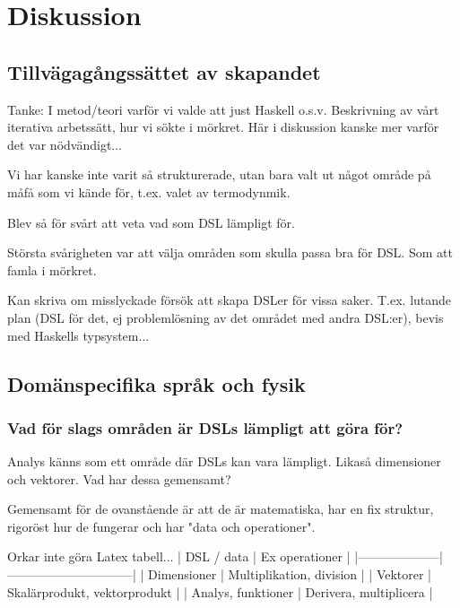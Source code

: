 
\chapter{Diskussion}

\begin{binge}
\section{Tillvägagångssättet av skapandet}

Tanke: I metod/teori varför vi valde att just Haskell o.s.v. Beskrivning av vårt iterativa arbetssätt, hur vi sökte i mörkret. Här i diskussion kanske mer varför det var nödvändigt...

Vi har kanske inte varit så strukturerade, utan bara valt ut något område på måfå som vi kände för, t.ex. valet av termodynmik.

Blev så för svårt att veta vad som DSL lämpligt för.

Största svårigheten var att välja områden som skulla passa bra för DSL. Som att
famla i mörkret.

Kan skriva om misslyckade försök att skapa DSLer för vissa saker. T.ex. lutande plan (DSL för det, ej problemlösning av det området med andra DSL:er), bevis med Haskells typsystem...

\section{Domänspecifika språk och fysik}

\subsection{Vad för slags områden är DSLs lämpligt att göra för?}

Analys känns som ett område där DSLs kan vara lämpligt. Likaså dimensioner och
vektorer. Vad har dessa gemensamt?

Gemensamt för de ovanstående är att de är matematiska, har en fix struktur,
rigoröst hur de fungerar och har "data och operationer".

Orkar inte göra Latex tabell...
| DSL / data         | Ex operationer               |
|--------------------|------------------------------|
| Dimensioner        | Multiplikation, division     |
| Vektorer           | Skalärprodukt, vektorprodukt |
| Analys, funktioner | Derivera, multiplicera       |


\end{binge}
